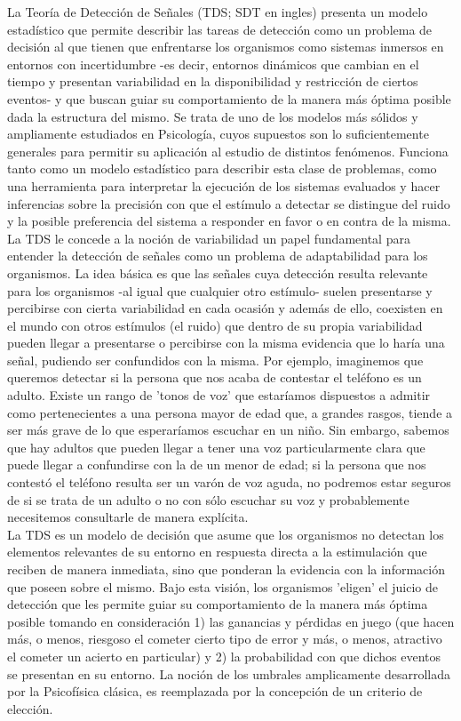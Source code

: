La Teoría de Detección de Señales (TDS; SDT en ingles) presenta un modelo estadístico que permite describir las tareas de detección como un problema de decisión al que tienen que enfrentarse los organismos como sistemas inmersos en entornos con incertidumbre -es decir, entornos dinámicos que cambian en el tiempo y presentan variabilidad en la disponibilidad y restricción de ciertos eventos- y que buscan guiar su comportamiento de la manera más óptima posible dada la estructura del mismo. Se trata de uno de los modelos más sólidos y ampliamente estudiados en Psicología, cuyos supuestos son lo suficientemente generales para permitir su aplicación al estudio de distintos fenómenos. Funciona tanto como un modelo estadístico para describir esta clase de problemas, como una herramienta para interpretar la ejecución de los sistemas evaluados y hacer inferencias sobre la precisión con que el estímulo a detectar se distingue del ruido y la posible preferencia del sistema a responder en favor o en contra de la misma.\\

La TDS le concede a la noción de variabilidad un papel fundamental para entender la detección de señales como un problema de adaptabilidad para los organismos. La idea básica es que las señales cuya detección resulta relevante para los organismos -al igual que cualquier otro estímulo- suelen presentarse y percibirse con cierta variabilidad en cada ocasión y además de ello, coexisten en el mundo con otros estímulos (el ruido) que dentro de su propia variabilidad pueden llegar a presentarse o percibirse con la misma evidencia que lo haría una señal, pudiendo ser confundidos con la misma. Por ejemplo, imaginemos que queremos detectar si la persona que nos acaba de contestar el teléfono es un adulto. Existe un rango de 'tonos de voz' que estaríamos dispuestos a admitir como pertenecientes a una persona mayor de edad que, a grandes rasgos, tiende a ser más grave de lo que esperaríamos escuchar en un niño. Sin embargo, sabemos que hay adultos que pueden llegar a tener una voz particularmente clara que puede llegar a confundirse con la de un menor de edad; si la persona que nos contestó el teléfono resulta ser un varón de voz aguda, no podremos estar seguros de si se trata de un adulto o no con sólo escuchar su voz y probablemente necesitemos consultarle de manera explícita.\\

La TDS es un modelo de decisión que asume que los organismos no detectan los elementos relevantes de su entorno en respuesta directa a la estimulación que reciben de manera inmediata, sino que ponderan la evidencia con la información que poseen sobre el mismo. Bajo esta visión, los organismos 'eligen' el juicio de detección que les permite guiar su comportamiento de la manera más óptima posible tomando en consideración 1) las ganancias y pérdidas en juego (que hacen más, o menos, riesgoso el cometer cierto tipo de error y más, o menos, atractivo el cometer un acierto en particular) y 2) la probabilidad con que dichos eventos se presentan en su entorno.  La noción de los umbrales amplicamente desarrollada por la Psicofísica clásica, es reemplazada por la concepción de un criterio de elección.\\ 

